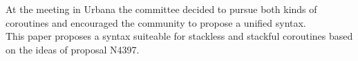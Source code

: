At the meeting in Urbana the committee decided to pursue both kinds of
coroutines and encouraged the community to propose a unified syntax.\\
This paper proposes a syntax suiteable for stackless and stackful coroutines
based on the ideas of proposal N4397\cite{N4397}.

